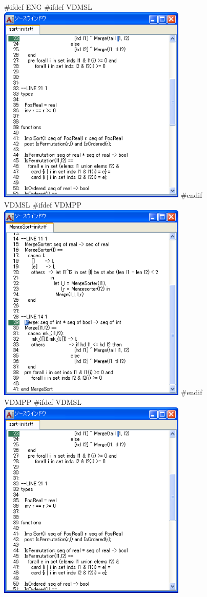\documentclass[\pformat,12pt]{article}
\begin{document}
\begin{figure}[tbh]
\begin{center}
#ifdef ENG
#ifdef VDMSL
\includegraphics[width=9cm]{sourceWindow-sl.png}
#endif VDMSL
#ifdef VDMPP
\includegraphics[width=9cm]{sourceWindow-pp.png}
#endif VDMPP
#ifdef VDMSL
\includegraphics[width=9cm]{sourceWindow-sl.png}

\end{center}
\end{figure}
\end{document}
